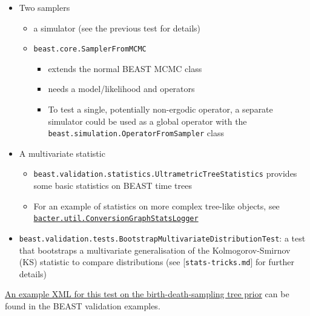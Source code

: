 \documentclass[oneside]{article}
\begin{document}
\begin{itemize}
\item
  Two samplers

  \begin{itemize}
  \item
    a simulator (see the previous test for details)
  \item
    \texttt{beast.core.SamplerFromMCMC}

    \begin{itemize}
    \item
      extends the normal BEAST MCMC class
    \item
      needs a model/likelihood and operators
    \item
      To test a single, potentially non-ergodic operator, a separate
      simulator could be used as a global operator with the
      \texttt{beast.simulation.OperatorFromSampler} class
    \end{itemize}
  \end{itemize}
\item
  A multivariate statistic

  \begin{itemize}
  \item
    \texttt{beast.validation.statistics.UltrametricTreeStatistics}
    provides some basic statistics on BEAST time trees
  \item
    For an example of statistics on more complex tree-like objects, see
    \href{https://github.com/tgvaughan/bacter/blob/master/src/bacter/util/ConversionGraphStatsLogger.java}{\texttt{bacter.util.ConversionGraphStatsLogger}}
  \end{itemize}
\item
  \texttt{beast.validation.tests.BootstrapMultivariateDistributionTest}:
  a test that bootstraps a multivariate generalisation of the
  Kolmogorov-Smirnov (KS) statistic to compare distributions (see
  {[}\texttt{stats-tricks.md}{]} for further details)
\end{itemize}

\href{https://github.com/christiaanjs/beast-validation/blob/master/examples/birth-death-sampling-prior-sampling-test.xml}{An
example XML for this test on the birth-death-sampling tree prior} can be
found in the BEAST validation examples.
\end{document}
